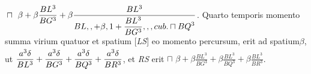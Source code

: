 $\rule[-4mm]{0mm}{10mm}\displaystyle \sqcap\hspace{4pt}\beta+\beta\frac{BL^3}{BG^3}+\beta\frac{BL^3}{BL,,+\beta, 1+\displaystyle\frac{BL^3}{BG^3},,, cub.\sqcap BQ^3}$. Quarto temporis momento  summa virium quatuor et spatium [\textit{LS}] eo momento percursum, erit ad spatium$\beta$, ut $\rule[-4mm]{0mm}{10mm}\displaystyle \frac{a^3\delta}{BL^3}+\frac{a^3\delta}{BG^3}+\frac{a^3\delta}{BQ^3}+ \frac{a^3\delta}{BR^3}$, et \textit{RS} erit 
                     $\displaystyle \sqcap\hspace{4pt}\beta + \beta\frac{BL^3}{BG^3}+\beta\frac{BL^3}{BQ^3}+\beta\frac{BL^3}{BR^3}$. 
                     \rule[-4mm]{0mm}{10mm}
